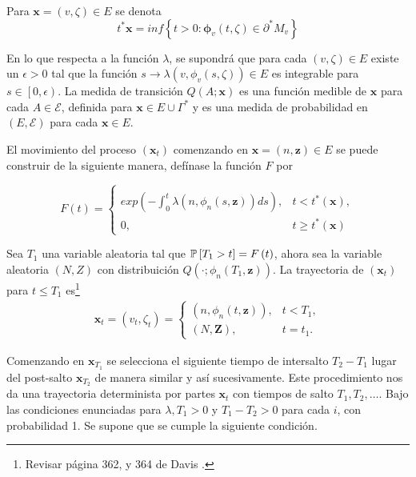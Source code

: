 Para $\mathbf{x}=\left(v,\zeta\right)\in E$ se denota
\[t^{*}\mathbf{x}=inf\left\{t>0:\mathbf{\phi}_{v}\left(t,\zeta\right)\in\partial^{*}M_{v}\right\}\]

En lo que respecta a la funci\'on $\lambda$, se supondr\'a que
para cada $\left(v,\zeta\right)\in E$ existe un $\epsilon>0$ tal
que la funci\'on
$s\rightarrow\lambda\left(v,\phi_{v}\left(s,\zeta\right)\right)\in
E$ es integrable para $s\in\left[0,\epsilon\right)$. La medida de
transici\'on $Q\left(A;\mathbf{x}\right)$ es una funci\'on medible
de $\mathbf{x}$ para cada $A\in\mathcal{E}$, definida para
$\mathbf{x}\in E\cup\Gamma^{*}$ y es una medida de probabilidad en
$\left(E,\mathcal{E}\right)$ para cada $\mathbf{x}\in E$.

El movimiento del proceso $\left(\mathbf{x}_{t}\right)$ comenzando
en $\mathbf{x}=\left(n,\mathbf{z}\right)\in E$ se puede construir
de la siguiente manera, def\'inase la funci\'on $F$ por

\begin{equation}
F\left(t\right)=\left\{\begin{array}{ll}\\
exp\left(-\int_{0}^{t}\lambda\left(n,\phi_{n}\left(s,\mathbf{z}\right)\right)ds\right), & t<t^{*}\left(\mathbf{x}\right),\\
0, & t\geq t^{*}\left(\mathbf{x}\right)
\end{array}\right.
\end{equation}

Sea $T_{1}$ una variable aleatoria tal que
$\mathbb{P}\left[T_{1}>t\right]=F\left(t\right)$, ahora sea la variable
aleatoria $\left(N,Z\right)$ con distribuici\'on
$Q\left(\cdot;\phi_{n}\left(T_{1},\mathbf{z}\right)\right)$. La
trayectoria de $\left(\mathbf{x}_{t}\right)$ para $t\leq T_{1}$
es\footnote{Revisar p\'agina 362, y 364 de Davis \cite{Davis}.}
\begin{eqnarray*}
\mathbf{x}_{t}=\left(v_{t},\zeta_{t}\right)=\left\{\begin{array}{ll}
\left(n,\phi_{n}\left(t,\mathbf{z}\right)\right), & t<T_{1},\\
\left(N,\mathbf{Z}\right), & t=t_{1}.
\end{array}\right.
\end{eqnarray*}

Comenzando en $\mathbf{x}_{T_{1}}$ se selecciona el siguiente
tiempo de intersalto $T_{2}-T_{1}$ lugar del post-salto
$\mathbf{x}_{T_{2}}$ de manera similar y as\'i sucesivamente. Este
procedimiento nos da una trayectoria determinista por partes
$\mathbf{x}_{t}$ con tiempos de salto $T_{1},T_{2},\ldots$. Bajo
las condiciones enunciadas para $\lambda,T_{1}>0$  y
$T_{1}-T_{2}>0$ para cada $i$, con probabilidad 1. Se supone que
se cumple la siguiente condici\'on.

